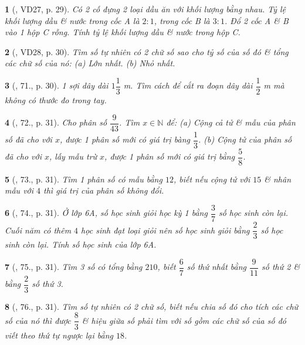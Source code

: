 \documentclass{article}
\newtheorem{baitoan}{}
\begin{document}
\begin{baitoan}[\cite{Binh_Toan_6_tap_2}, VD27, p. 29]
	Có 2 cố đựng 2 loại dầu ăn với khối lượng bằng nhau. Tỷ lệ khối lượng dầu \& nước trong cốc A là $2:1$, trong cốc B là $3:1$. Đổ 2 cốc A \& B vào 1 hộp C rỗng. Tính tỷ lệ khối lượng dầu \& nước trong hộp C.
\end{baitoan}

\begin{baitoan}[\cite{Binh_Toan_6_tap_2}, VD28, p. 30]
	Tìm số tự nhiên có 2 chữ số sao cho tỷ số của số đó \& tổng các chữ số của nó: (a) Lớn nhất. (b) Nhỏ nhất.
\end{baitoan}

\begin{baitoan}[\cite{Binh_Toan_6_tap_2}, 71., p. 30]
	1 sợi dây dài $1\dfrac{1}{3}$ {\rm m}. Tìm cách để cắt ra đoạn dây dài $\dfrac{1}{2}$ {\rm m} mà không có thước đo trong tay.
\end{baitoan}

\begin{baitoan}[\cite{Binh_Toan_6_tap_2}, 72., p. 31]
	Cho phân số $\dfrac{9}{43}$. Tìm $x\in\mathbb{N}$ để: (a) Cộng cả tử \& mẫu của phân số đã cho với $x$, được 1 phân số mới có giá trị bàng $\dfrac{1}{3}$. (b) Cộng tử của phân số đã cho với $x$, lấy mẫu trừ $x$, được 1 phân số mới có giá trị bằng $\dfrac{5}{8}$.
\end{baitoan}

\begin{baitoan}[\cite{Binh_Toan_6_tap_2}, 73., p. 31]
	Tìm 1 phân số có mẫu bằng $12$, biết nếu cộng tử với $15$ \& nhân mẫu với $4$ thì giá trị của phân số không đổi.
\end{baitoan}

\begin{baitoan}[\cite{Binh_Toan_6_tap_2}, 74., p. 31]
	Ở lớp 6A, số học sinh giỏi học kỳ 1 bằng $\dfrac{3}{7}$ số học sinh còn lại. Cuối năm có thêm $4$ học sinh đạt loại giỏi nên số học sinh giỏi bằng $\dfrac{2}{3}$ số học sinh còn lại. Tính số học sinh của lớp 6A.
\end{baitoan}

\begin{baitoan}[\cite{Binh_Toan_6_tap_2}, 75., p. 31]
	Tìm 3 số có tổng bằng $210$, biết $\dfrac{6}{7}$ số thứ nhất bằng $\dfrac{9}{11}$ số thứ 2 \& bằng $\dfrac{2}{3}$ số thứ 3.
\end{baitoan}

\begin{baitoan}[\cite{Binh_Toan_6_tap_2}, 76., p. 31]
	Tìm số tự nhiên có 2 chữ số, biết nếu chia số đó cho tích các chữ số của nó thì được $\dfrac{8}{3}$ \& hiệu giữa số phải tìm với số gồm các chữ số của số đó viết theo thứ tự ngược lại bằng $18$.
\end{baitoan}
\end{document}
